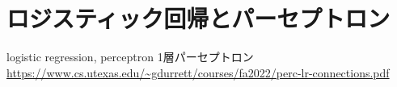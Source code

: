 \section{ロジスティック回帰とパーセプトロン}
logistic regression, perceptron
1層パーセプトロン
\url{https://www.cs.utexas.edu/~gdurrett/courses/fa2022/perc-lr-connections.pdf}
